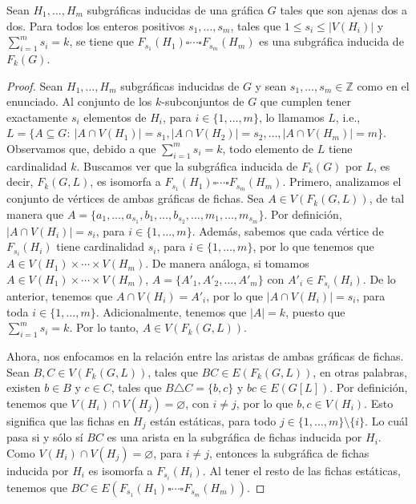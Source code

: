 \begin{teorema}
    \label{teo:PCartes}
    Sean $H_1, \dots, H_m$ subgr\'aficas inducidas de una gr\'afica $G$ tales
    que son ajenas dos a dos. Para todos los enteros positivos $s_1, \dots,
    s_m$, tales que $1 \leq s_i \leq |V(H_i)|$ y $\sum\limits_{i=1}^{m}  s_i =
    k$, se tiene que $F_{s_1}(H_1) \square \cdots \square F_{s_m}(H_m)$ es una
    subgr\'afica inducida de $F_k(G)$.
\end{teorema}

\begin{proof}
    Sean $H_1, \dots, H_m$ subgr\'aficas inducidas de  $G$ y sean $s_1, \dots,
    s_m \in \mathbb{Z}$ como en el enunciado. Al conjunto de los
    $k$-subconjuntos de $G$ que cumplen tener exactamente $s_i$ elementos de
    $H_i$, para $i \in \{1, \dots, m\}$, lo llamamos $L$, i.e., $L = \{A
    \subseteq G \colon\ |A\cap V(H_1)|=s_1 , |A \cap V(H_2)|=s_2, \dots, |A \cap
    V(H_m)|=m \}$. Observamos que, debido a  que $\sum\limits_{i=1}^{m} s_i =
    k$, todo elemento de $L$ tiene cardinalidad $k$. Buscamos ver que la
    subgr\'afica inducida de $F_k(G)$ por $L$, es decir, $F_k(G,L)$, es isomorfa
    a $F_{s_1}(H_1) \square \cdots \square F_{s_m}(H_m)$. Primero, analizamos el
    conjunto de v\'ertices de ambas gr\'aficas de fichas. Sea $A \in
    V(F_k(G,L))$, de tal manera que $A=\{a_1, \dots, a_{s_1}, b_1,\dots,
    b_{s_2}, \dots, m_1, \dots, m_{s_m}\}$. Por definici\'on, $|A \cap V(H_i)|=
    s_i$, para $i \in \{1, \dots, m\}$. Adem\'as, sabemos que cada v\'ertice de
    $F_{s_i}(H_i)$ tiene cardinalidad $s_i$, para $i \in \{1, \dots, m\}$, por
    lo que tenemos que $A \in V(H_1) \times \cdots \times V(H_m)$. De manera
    an\'aloga, si tomamos $A \in V(H_1) \times \cdots \times V(H_m)$, $A =
    \{A'_1, A'_2, \dots, A'_m\}$ con $A'_i \in F_{s_i}(H_i)$. De lo anterior,
    tenemos que $A \cap V(H_i) = A'_i$, por lo que $|A \cap V(H_i)|= s_i$, para
    toda $i \in \{1, \dots, m\}$. Adicionalmente, tenemos que $|A|= k$, puesto
    que $\sum\limits_{i=1}^{m} s_i = k$. Por lo tanto, $A \in V(F_k(G,L))$.

    Ahora, nos enfocamos en la relaci\'on entre las aristas de ambas gr\'aficas
    de fichas. Sean $B, C \in V(F_k(G,L))$, tales que $BC \in E(F_k(G,L))$, en
    otras palabras, existen $b \in B$ y $c \in C$, tales que $B \triangle C =
    \{b, c\}$ y $bc \in E(G[L])$. Por definici\'on, tenemos que $V(H_i) \cap
    V(H_j) = \varnothing$, con $i \neq j$, por lo que $b, c \in V(H_i)$. Esto
    significa que las fichas en $H_j$ est\'an est\'aticas, para todo $j \in \{1,
    \dots, m\} \setminus \{i\}$. Lo cu\'al pasa si y s\'olo s\'i $BC$ es una
    arista en la subgr\'afica de fichas inducida por $H_i$. Como $V(H_i) \cap
    V(H_j) = \varnothing$, para $i \neq j$, entonces la subgr\'afica de fichas
    inducida por $H_i$ es isomorfa a $F_{s_i}(H_i)$. Al tener el resto de las
    fichas est\'aticas, tenemos que $BC \in E(F_{s_1}(H_1) \square \cdots
    \square F_{s_m}(H_m))$.


\end{proof}
